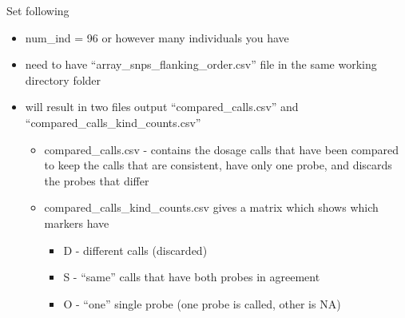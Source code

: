 \documentclass[
]{article}
\begin{document}
Set following

\begin{itemize}
\item
  num\_ind = 96 or however many individuals you have
\item
  need to have ``array\_snps\_flanking\_order.csv'' file in the same
  working directory folder
\item
  will result in two files output ``compared\_calls.csv'' and
  ``compared\_calls\_kind\_counts.csv''

  \begin{itemize}
  \item
    compared\_calls.csv - contains the dosage calls that have been
    compared to keep the calls that are consistent, have only one probe,
    and discards the probes that differ
  \item
    compared\_calls\_kind\_counts.csv gives a matrix which shows which
    markers have

    \begin{itemize}
    \item
      D - different calls (discarded)
    \item
      S - ``same'' calls that have both probes in agreement
    \item
      O - ``one'' single probe (one probe is called, other is NA)
    \end{itemize}
  \end{itemize}
\end{itemize}
\end{document}
